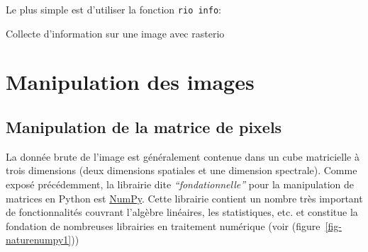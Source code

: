 \documentclass[
  11pt,
  letterpaper,
  open=any,
  twoside=false,
  french]{scrbook}
\newenvironment{Shaded}{\begin{snugshade}}{\end{snugshade}}
\newcommand{\DecValTok}[1]{\textcolor[rgb]{0.68,0.00,0.00}{#1}}
\newcommand{\NormalTok}[1]{\textcolor[rgb]{0.00,0.23,0.31}{#1}}
\newcommand{\OperatorTok}[1]{\textcolor[rgb]{0.37,0.37,0.37}{#1}}
\begin{document}
Le plus simple est d'utiliser la fonction \texttt{rio\ info}:

\begin{codelisting}

\caption{\label{lst-rioinfo}Collecte d'information sur une image avec
rasterio}

\centering{

\begin{Shaded}
\begin{Highlighting}[]
\OperatorTok{!}\NormalTok{rio info RGBNIR\_of\_S2A.tif }\OperatorTok{{-}{-}}\NormalTok{indent }\DecValTok{2} \OperatorTok{{-}{-}}\NormalTok{verbose}
\end{Highlighting}
\end{Shaded}

}

\end{codelisting}%

\section{Manipulation des images}\label{manipulation-des-images}

\subsection{Manipulation de la matrice de
pixels}\label{manipulation-de-la-matrice-de-pixels}

La donnée brute de l'image est généralement contenue dans un cube
matricielle à trois dimensions (deux dimensions spatiales et une
dimension spectrale). Comme exposé précédemment, la librairie dite
\emph{``fondationnelle''} pour la manipulation de matrices en Python est
\href{https://numpy.org/}{NumPy}. Cette librairie contient un nombre
très important de fonctionnalités couvrant l'algèbre linéaires, les
statistiques, etc. et constitue la fondation de nombreuses librairies en
traitement numérique (voir (figure~\ref{fig-naturenumpy1}))
\end{document}
